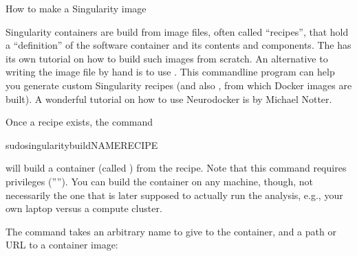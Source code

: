 \ignorespaces \begin{findoutmore}[label={fom-container-creation}, before title={\thetcbcounter\ }, float, floatplacement=tb, check odd page=true]{How to make a Singularity image}
\label{\detokenize{basics/101-133-containersrun:fom-container-creation}}

\sphinxAtStartPar
Singularity containers are build from image files, often
called “recipes”, that hold a “definition” of the software container and its
contents and components. The
has its own tutorial on how to build such images from scratch.
An alternative to writing the image file by hand is to use
. This
command\sphinxhyphen{}line program can help you generate custom Singularity recipes (and
also , from which Docker images are built). A wonderful tutorial
on how to use Neurodocker is
by Michael Notter.

\sphinxAtStartPar
Once a recipe exists, the command

\begin{sphinxVerbatim}[commandchars=\\\{\}]
sudosingularitybuild\PYGZlt{}NAME\PYGZgt{}\PYGZlt{}RECIPE\PYGZgt{}
\end{sphinxVerbatim}

\sphinxAtStartPar
will build a container (called ) from the recipe. Note that this
command requires  privileges (””). You can build the container
on any machine, though, not necessarily the one that is later supposed to
actually run the analysis, e.g., your own laptop versus a compute cluster.


\end{findoutmore}

\ignorespaces 
\sphinxAtStartPar
The  command takes an arbitrary
name to give to the container, and a path or URL to a container image:

